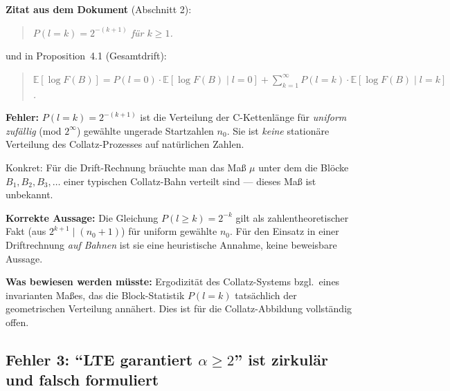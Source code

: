 \documentclass[12pt,a4paper]{article}
\newcommand{\E}{\mathbb{E}}
\newcommand{\logF}{\log F(B)}
\begin{document}
\begin{tcolorbox}[korrektur, title={Fehler 2 --- Fehlende Maßstruktur}]
\textbf{Zitat aus dem Dokument} (Abschnitt 2):
\begin{quote}
\itshape
$P(l{=}k) = 2^{-(k+1)}$ für $k \geq 1$.
\end{quote}
und in Proposition~4.1 (Gesamtdrift):
\begin{quote}
\itshape
$\E[\logF] = P(l{=}0)\cdot\E[\logF \mid l{=}0] + \sum_{k=1}^{\infty} P(l{=}k)\cdot\E[\logF \mid l{=}k]$.
\end{quote}

\medskip
\textbf{Fehler:} $P(l{=}k) = 2^{-(k+1)}$ ist die Verteilung der C-Kettenlänge
für \emph{uniform zufällig} (mod $2^\infty$) gewählte ungerade Startzahlen $n_0$.
Sie ist \emph{keine} stationäre Verteilung des Collatz-Prozesses auf natürlichen
Zahlen.

Konkret: Für die Drift-Rechnung bräuchte man das Maß $\mu$ unter dem die
Blöcke $B_1, B_2, B_3, \ldots$ einer typischen Collatz-Bahn verteilt sind ---
dieses Maß ist unbekannt.

\medskip
\textbf{Korrekte Aussage:} Die Gleichung $P(l \geq k) = 2^{-k}$ gilt als
zahlentheoretischer Fakt (aus $2^{k+1} \mid (n_0 + 1)$) für uniform
gewählte $n_0$. Für den Einsatz in einer Driftrechnung \emph{auf Bahnen}
ist sie eine heuristische Annahme, keine beweisbare Aussage.

\medskip
\textbf{Was bewiesen werden müsste:}
Ergodizität des Collatz-Systems bzgl.\ eines invarianten Maßes, das die
Block-Statistik $P(l{=}k)$ tatsächlich der geometrischen Verteilung annähert.
Dies ist für die Collatz-Abbildung vollständig offen.
\end{tcolorbox}

\subsection{Fehler 3: \texorpdfstring{``LTE garantiert $\alpha \geq 2$''}{``LTE garantiert alpha >= 2''} ist zirkulär und falsch formuliert}
\end{document}
